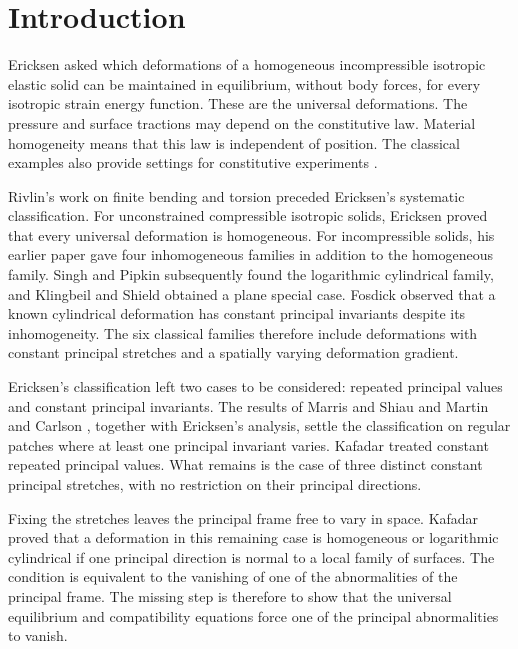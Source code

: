 \documentclass[11pt,a4paper]{article}
\numberwithin{equation}{section}
\theoremstyle{plain}
\theoremstyle{definition}
\theoremstyle{remark}
\begin{document}
\section{Introduction}\label{sec:introduction}

Ericksen \cite{Ericksen1954} asked which deformations of a homogeneous
incompressible isotropic elastic solid can be maintained in equilibrium,
without body forces, for every isotropic strain energy function. These
are the universal deformations. The pressure and surface tractions may
depend on the constitutive law. Material homogeneity means that this law
is independent of position. The classical examples also provide settings
for constitutive experiments \cite{RivlinSaunders1951,Saccomandi2001}.

Rivlin's work on finite bending and torsion
\cite{Rivlin1948,Rivlin1949Flexure,Rivlin1949Torsion} preceded Ericksen's
systematic classification. For unconstrained compressible isotropic
solids, Ericksen \cite{Ericksen1955} proved that every universal
deformation is homogeneous. For incompressible solids, his earlier paper
\cite{Ericksen1954} gave four inhomogeneous families in addition to the
homogeneous family. Singh and Pipkin \cite{SinghPipkin1965} subsequently
found the logarithmic cylindrical family, and Klingbeil and Shield
\cite{KlingbeilShield1966} obtained a plane special case. Fosdick
\cite{Fosdick1966} observed that a known cylindrical deformation has
constant principal invariants despite its inhomogeneity. The six
classical families therefore include deformations with constant principal
stretches and a spatially varying deformation gradient.

Ericksen's classification left two cases to be considered: repeated
principal values and constant principal invariants. The results of
Marris and Shiau \cite{MarrisShiau1970,MarrisShiauCorr1970} and Martin and
Carlson \cite{MartinCarlson1976}, together with Ericksen's analysis,
settle the classification on regular patches where at least one principal
invariant varies. Kafadar \cite{Kafadar1972} treated constant repeated
principal values. What remains is the case of three distinct constant
principal stretches, with no restriction on their principal directions.

Fixing the stretches leaves the principal frame free to vary in space.
Kafadar \cite{Kafadar1972} proved that a deformation in this remaining
case is homogeneous or logarithmic cylindrical if one principal
direction is normal to a local family of surfaces. The condition is
equivalent to the vanishing of one of the abnormalities of the principal
frame. The missing step is therefore to show that the universal equilibrium
and compatibility equations force one of the principal abnormalities
to vanish.
\end{document}
